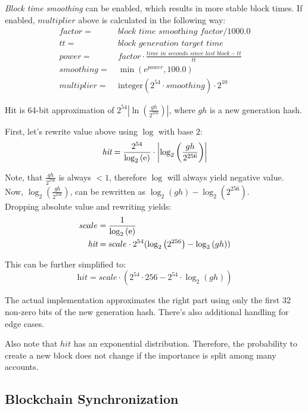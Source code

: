 \emph{Block time smoothing} can be enabled, which results in more stable block times.
If enabled, $multiplier$ above is calculated in the following way:
\begin{align*}
factor = \: & \textit{block time smoothing factor} / 1000.0 \\
tt = \: & \textit{block generation target time} \\
power = \: & factor \cdot \frac{\textit{time in seconds since last block} - tt}{tt} \\
smoothing = \: & \min\left(e^{power}, 100.0\right) \\
multiplier = \: & \mathrm{integer}\left(2^{54} \cdot smoothing\right) \cdot 2^{10}
\end{align*}

Hit is 64-bit approximation of $2^{54} \left|\ln\left(\frac{gh}{2^{256}}\right)\right|$, where $gh$ is a new generation hash.

First, let's rewrite value above using $\log$ with base $2$:
$$
\textit{hit} = \frac{2^{54}}{\log_2\left(\mathrm{e}\right)} \cdot \left|\log_2\left(\frac{gh}{2^{256}}\right)\right|
$$

Note, that $\frac{gh}{2^{256}}$ is always $< 1$, therefore $\log$ will always yield negative value. \\
Now, $\log_2\left(\frac{gh}{2^{256}}\right)$, can be rewritten as $\log_2\left(gh\right) - \log_2\left(2^{256}\right)$. \\

Dropping absolute value and rewriting yields:
\begin{align*}
	scale = \: & \frac{1}{\log_2\left(\mathrm{e}\right)} \\
	\textit{hit} = \: & scale \cdot 2^{54} (\log_2\left(2^{256}\right) - \log_2\left(gh\right))
\end{align*}

This can be further simplified to:
$$
\textit{hit} =  scale \cdot ( 2^{54} \cdot 256 -  2^{54} \cdot \log_2\left(gh\right))
$$

The actual implementation approximates the right part using only the first 32 non-zero bits of the new generation hash.
There's also additional handling for edge cases.

Also note that $\mathit{hit}$ has an exponential distribution. Therefore, the probability to create a new block does not change if the importance is split among many accounts.

\subsection{Blockchain Synchronization}
\label{sec:blockSync}


